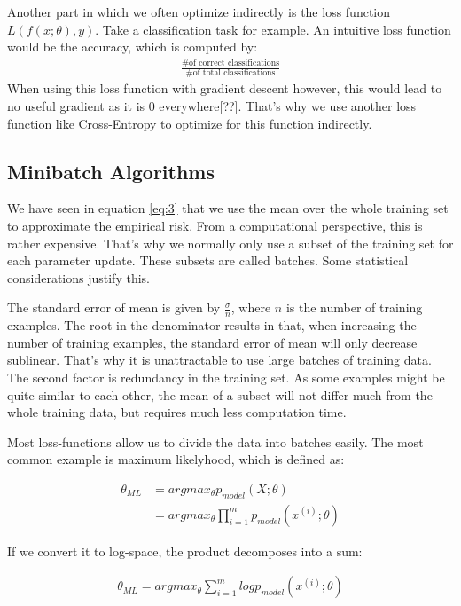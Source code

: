 Another part in which we often optimize indirectly is the loss function
$L(f(x;\theta), y)$. Take a classification task for example. An intuitive loss
function would be the accuracy, which is computed by:
\begin{align}
    \frac{\textrm{\# of correct classifications}}{\textrm{\# of total classifications}}
\end{align}
When using this loss function with gradient descent however, this would lead to
no useful gradient as it is 0 everywhere[??]. That's why we use another loss
function like Cross-Entropy to optimize for this function indirectly.

\subsection{Minibatch Algorithms}\label{sub:3}
We have seen in equation \ref{eq:3} that we use the mean over the whole training
set to approximate the empirical risk. From a computational perspective, this is
rather expensive. That's why we normally only use a subset of the training set
for each parameter update. These subsets are called batches. Some statistical
considerations justify this.

The standard error of mean is given by $\frac{\sigma}{n}$, where $n$ is the
number of training examples. The root in the denominator results in that, when
increasing the number of training examples, the standard error of mean will
only decrease sublinear. That's why it is unattractable to use large batches of
training data. The second factor is redundancy in the training set. As some
examples might be quite similar to each other, the mean of a subset will not
differ much from the whole training data, but requires much less computation
time.

Most loss-functions allow us to divide the data into batches easily. The most
common example is maximum likelyhood, which is defined as:

\begin{align}
    \theta_{ML}
    & = argmax_{\theta} p_{model}(X; \theta) \\
    & = argmax_{\theta} \prod_{i=1}^m p_{model}(x^{(i)}; \theta)
\end{align}

If we convert it to log-space, the product decomposes into a sum:

\begin{align}
    \theta_{ML} = argmax_{\theta} \sum_{i=1}^m log p_{model}(x^{(i)}; \theta)
\end{align}

